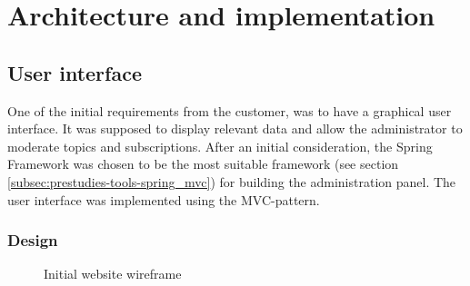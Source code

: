 
\chapter{Architecture and implementation}
\label{ch:architecture_and_implementation}

\section{User interface}
\label{sec:architecture_and_implementation-user_interface}

One of the initial requirements from the customer, was to have a graphical user interface. It was supposed to display relevant data and allow the administrator to moderate topics and subscriptions. After an initial consideration, the Spring Framework was chosen to be the most suitable framework (see section  \ref{subsec:prestudies-tools-spring_mvc}) for building the administration panel. The user interface was implemented using the MVC-pattern. 

\subsection{Design}
\label{subsec:architecture_and_implementation-user_interface-design}

\begin{center}
  \begin{figure}[ht!]
    \caption{Initial website wireframe}
    \label{fig:initial_prototype}
  \end{figure}
\end{center}

